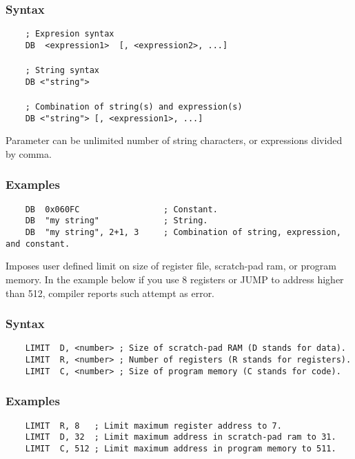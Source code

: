     \subsubsection{Syntax}
        \verb'    ; Expresion syntax'\\
        \verb'    DB  <expression1>  [, <expression2>, ...]'\\
        \verb''\\
        \verb'    ; String syntax'\\
        \verb'    DB <"string">'\\
        \verb''\\
        \verb'    ; Combination of string(s) and expression(s)'\\
        \verb'    DB <"string"> [, <expression1>, ...]'

        Parameter can be unlimited number of string characters, or expressions divided by comma.


    \subsubsection{Examples}
        \verb'    DB  0x060FC                 ; Constant.'\\
        \verb'    DB  "my string"             ; String.'\\
        \verb'    DB  "my string", 2+1, 3     ; Combination of string, expression, and constant.'

    Imposes user defined limit on size of register file, scratch-pad ram, or program memory. In the example below if you use 8 registers or JUMP to address higher than 512, compiler reports such attempt as error.

    \subsubsection{Syntax}
        \verb'    LIMIT  D, <number> ; Size of scratch-pad RAM (D stands for data).'\\
        \verb'    LIMIT  R, <number> ; Number of registers (R stands for registers).'\\
        \verb'    LIMIT  C, <number> ; Size of program memory (C stands for code).'

    \subsubsection{Examples}
        \verb'    LIMIT  R, 8   ; Limit maximum register address to 7.'\\
        \verb'    LIMIT  D, 32  ; Limit maximum address in scratch-pad ram to 31. '\\
        \verb'    LIMIT  C, 512 ; Limit maximum address in program memory to 511.'

